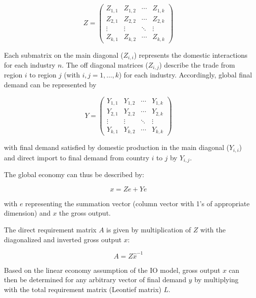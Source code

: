 \documentclass{jors}
\begin{document}
{\begin{equation}
    Z =
    \begin{pmatrix}
      Z_{1,1} & Z_{1,2} & \cdots & Z_{1,k} \\
      Z_{2,1} & Z_{2,2} & \cdots & Z_{2,k} \\
      \vdots  & \vdots  & \ddots & \vdots  \\
      Z_{k,1} & Z_{k,2} & \cdots & Z_{k,k}
    \end{pmatrix}
\end{equation}

Each submatrix on the main diagonal ($Z_{i,i}$) represents the domestic
interactions for each industry $n$. The off diagonal matrices ($Z_{i,j}$)
describe the trade from region $i$ to region $j$ (with $i, j = 1, \ldots, k$)
for each industry. Accordingly, global final demand can be represented by

\begin{equation}
    Y =
    \begin{pmatrix}
      Y_{1,1} & Y_{1,2} & \cdots & Y_{1,k} \\
      Y_{2,1} & Y_{2,2} & \cdots & Y_{2,k} \\
      \vdots  & \vdots  & \ddots & \vdots  \\
      Y_{k,1} & Y_{k,2} & \cdots & Y_{k,k}
    \end{pmatrix}
\end{equation}

with final demand satisfied by domestic production in the main diagonal
($Y_{i,i}$) and direct import to final demand from country $i$ to $j$ by
$Y_{i,j}$.

The global economy can thus be described by:

\begin{equation}
    x = Ze + Ye
\end{equation}

with $e$ representing the summation vector (column vector with 1's of
appropriate dimension) and $x$ the gross output.

The direct requirement matrix $A$ is given by multiplication of $Z$ with the
diagonalized and inverted gross output $x$:

\begin{equation}
    A = Z\hat{x}^{-1}
\end{equation}

Based on the linear economy assumption of the IO model, gross output $x$ can then be determined for any arbitrary vector of final demand $y$ by multiplying with the total requirement matrix (Leontief matrix) $L$.

}
\end{document}
